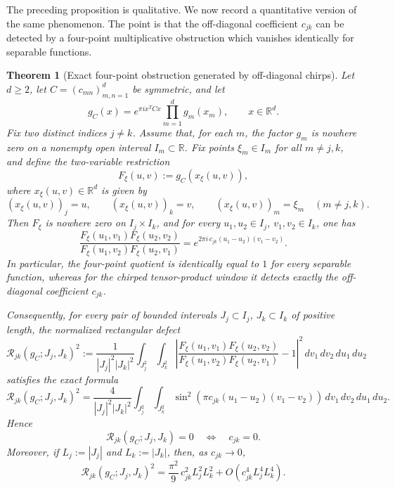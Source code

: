 \documentclass[final,1p,times,authoryear]{elsarticle}
\newtheorem{theorem}{Theorem}
\theoremstyle{definition}
\newcommand{\R}{\mathbb{R}}
\newcommand{\1}{\mathbf{1}}
\begin{document}
{The preceding proposition is qualitative. We now record a quantitative version of the same
phenomenon. The point is that the off-diagonal coefficient $c_{jk}$ can be detected by a
four-point multiplicative obstruction which vanishes identically for separable functions.}
\begin{theorem}[Exact four-point obstruction generated by off-diagonal chirps]
\label{thm:four_point_obstruction}
{Let $d\ge 2$, let $C=(c_{mn})_{m,n=1}^d$ be symmetric, and let
$$
g_C(x)
=
e^{\pi i x^T Cx}\prod_{m=1}^d g_m(x_m),
\qquad x\in\R^d.
$$
Fix two distinct indices $j\neq k$. Assume that, for each $m$, the factor $g_m$
is nowhere zero on a nonempty open interval $I_m\subset\R$. Fix points
$\xi_m\in I_m$ for all $m\neq j,k$, and define the two-variable restriction
$$
F_\xi(u,v)
:=
g_C(x_\xi(u,v)),
$$
where $x_\xi(u,v)\in\R^d$ is given by
$$
(x_\xi(u,v))_j=u,\qquad
(x_\xi(u,v))_k=v,\qquad
(x_\xi(u,v))_m=\xi_m\quad (m\neq j,k).
$$
Then $F_\xi$ is nowhere zero on $I_j\times I_k$, and for every
$u_1,u_2\in I_j$, $v_1,v_2\in I_k$, one has
$$
\frac{
F_\xi(u_1,v_1)F_\xi(u_2,v_2)
}{
F_\xi(u_1,v_2)F_\xi(u_2,v_1)
}
=
e^{2\pi i\,c_{jk}(u_1-u_2)(v_1-v_2)}.
$$
In particular, the four-point quotient is identically equal to $1$ for every
separable function, whereas for the chirped tensor-product window it detects exactly
the off-diagonal coefficient $c_{jk}$.}

{Consequently, for every pair of bounded intervals
$J_j\subset I_j$, $J_k\subset I_k$ of positive length, the normalized rectangular defect
$$
\mathcal R_{jk}(g_C;J_j,J_k)^2
:=
\frac{1}{|J_j|^2|J_k|^2}
\int_{J_j^2}\int_{J_k^2}
\left|
\frac{
F_\xi(u_1,v_1)F_\xi(u_2,v_2)
}{
F_\xi(u_1,v_2)F_\xi(u_2,v_1)
}
-1
\right|^2
\,dv_1\,dv_2\,du_1\,du_2
$$
satisfies the exact formula
$$
\mathcal R_{jk}(g_C;J_j,J_k)^2
=
\frac{4}{|J_j|^2|J_k|^2}
\int_{J_j^2}\int_{J_k^2}
\sin^2\!\left(
\pi c_{jk}(u_1-u_2)(v_1-v_2)
\right)
\,dv_1\,dv_2\,du_1\,du_2.
$$
Hence
$$
\mathcal R_{jk}(g_C;J_j,J_k)=0
\quad\Longleftrightarrow\quad
c_{jk}=0.
$$
Moreover, if $L_j:=|J_j|$ and $L_k:=|J_k|$, then, as $c_{jk}\to0$,
$$
\mathcal R_{jk}(g_C;J_j,J_k)^2
=
\frac{\pi^2}{9}\,c_{jk}^2 L_j^2L_k^2
+
O\!\left(c_{jk}^4 L_j^4L_k^4\right).
$$}
\end{theorem}
\end{document}
